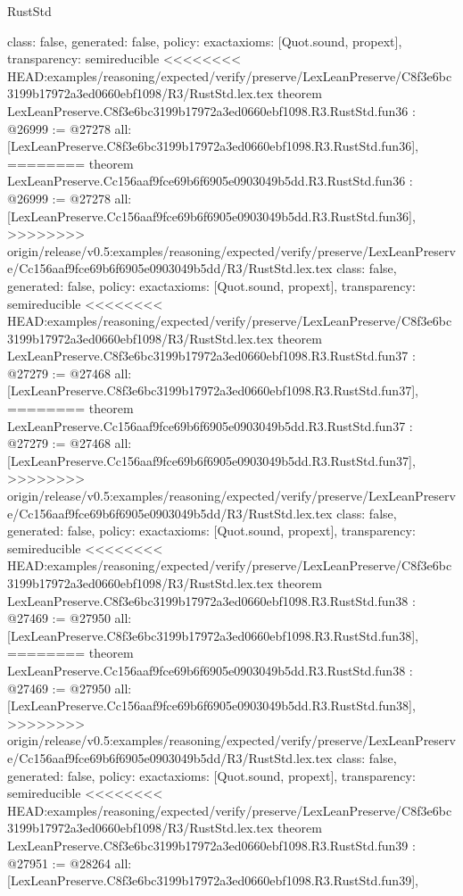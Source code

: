 \begin{lexlean}{RustStd}
\begin{coremodule}
{\begin{coremodule}
{{{{{{{{{{{{{{{{{{{{{{{{{{{{{{{{{{{{{{{  class: false,
  generated: false,
  policy: exact{axioms: [Quot.sound, propext]},
  transparency: semireducible
}
<<<<<<<< HEAD:examples/reasoning/expected/verify/preserve/LexLeanPreserve/C8f3e6bc3199b17972a3ed0660ebf1098/R3/RustStd.lex.tex
theorem LexLeanPreserve.C8f3e6bc3199b17972a3ed0660ebf1098.R3.RustStd.fun36 : @26999 := @27278 {
  all: [LexLeanPreserve.C8f3e6bc3199b17972a3ed0660ebf1098.R3.RustStd.fun36],
========
theorem LexLeanPreserve.Cc156aaf9fce69b6f6905e0903049b5dd.R3.RustStd.fun36 : @26999 := @27278 {
  all: [LexLeanPreserve.Cc156aaf9fce69b6f6905e0903049b5dd.R3.RustStd.fun36],
>>>>>>>> origin/release/v0.5:examples/reasoning/expected/verify/preserve/LexLeanPreserve/Cc156aaf9fce69b6f6905e0903049b5dd/R3/RustStd.lex.tex
  class: false,
  generated: false,
  policy: exact{axioms: [Quot.sound, propext]},
  transparency: semireducible
}
<<<<<<<< HEAD:examples/reasoning/expected/verify/preserve/LexLeanPreserve/C8f3e6bc3199b17972a3ed0660ebf1098/R3/RustStd.lex.tex
theorem LexLeanPreserve.C8f3e6bc3199b17972a3ed0660ebf1098.R3.RustStd.fun37 : @27279 := @27468 {
  all: [LexLeanPreserve.C8f3e6bc3199b17972a3ed0660ebf1098.R3.RustStd.fun37],
========
theorem LexLeanPreserve.Cc156aaf9fce69b6f6905e0903049b5dd.R3.RustStd.fun37 : @27279 := @27468 {
  all: [LexLeanPreserve.Cc156aaf9fce69b6f6905e0903049b5dd.R3.RustStd.fun37],
>>>>>>>> origin/release/v0.5:examples/reasoning/expected/verify/preserve/LexLeanPreserve/Cc156aaf9fce69b6f6905e0903049b5dd/R3/RustStd.lex.tex
  class: false,
  generated: false,
  policy: exact{axioms: [Quot.sound, propext]},
  transparency: semireducible
}
<<<<<<<< HEAD:examples/reasoning/expected/verify/preserve/LexLeanPreserve/C8f3e6bc3199b17972a3ed0660ebf1098/R3/RustStd.lex.tex
theorem LexLeanPreserve.C8f3e6bc3199b17972a3ed0660ebf1098.R3.RustStd.fun38 : @27469 := @27950 {
  all: [LexLeanPreserve.C8f3e6bc3199b17972a3ed0660ebf1098.R3.RustStd.fun38],
========
theorem LexLeanPreserve.Cc156aaf9fce69b6f6905e0903049b5dd.R3.RustStd.fun38 : @27469 := @27950 {
  all: [LexLeanPreserve.Cc156aaf9fce69b6f6905e0903049b5dd.R3.RustStd.fun38],
>>>>>>>> origin/release/v0.5:examples/reasoning/expected/verify/preserve/LexLeanPreserve/Cc156aaf9fce69b6f6905e0903049b5dd/R3/RustStd.lex.tex
  class: false,
  generated: false,
  policy: exact{axioms: [Quot.sound, propext]},
  transparency: semireducible
}
<<<<<<<< HEAD:examples/reasoning/expected/verify/preserve/LexLeanPreserve/C8f3e6bc3199b17972a3ed0660ebf1098/R3/RustStd.lex.tex
theorem LexLeanPreserve.C8f3e6bc3199b17972a3ed0660ebf1098.R3.RustStd.fun39 : @27951 := @28264 {
  all: [LexLeanPreserve.C8f3e6bc3199b17972a3ed0660ebf1098.R3.RustStd.fun39],
}}}}}}}}}}}}}}}}}}}}}}}}}}}}}}}}}}}}}}}}}}
\end{coremodule}}
\end{coremodule}
\end{lexlean}
